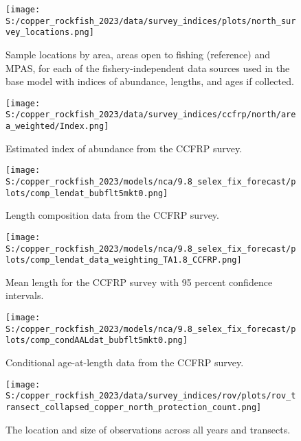 \documentclass[11pt,
  english,
  letterpaper,
]{article}
\begin{document}
\pagebreak

\begin{figure}
\centering
\texttt{[image: S:/copper\_rockfish\_2023/data/survey\_indices/plots/north\_survey\_locations.png]}
\caption{Sample locations by area, areas open to fishing (reference) and MPAS, for each of the fishery-independent data sources used in the base model with indices of abundance, lengths, and ages if collected.\label{fig:ref-mpa}}
\end{figure}

\pagebreak

\begin{figure}
\centering
\texttt{[image: S:/copper\_rockfish\_2023/data/survey\_indices/ccfrp/north/area\_weighted/Index.png]}
\caption{Estimated index of abundance from the CCFRP survey.\label{fig:ccfrp-index-main}}
\end{figure}

\pagebreak

\begin{figure}
\centering
\texttt{[image: S:/copper\_rockfish\_2023/models/nca/9.8\_selex\_fix\_forecast/plots/comp\_lendat\_bubflt5mkt0.png]}
\caption{Length composition data from the CCFRP survey.\label{fig:ccfrp-len-data}}
\end{figure}

\pagebreak

\begin{figure}
\centering
\texttt{[image: S:/copper\_rockfish\_2023/models/nca/9.8\_selex\_fix\_forecast/plots/comp\_lendat\_data\_weighting\_TA1.8\_CCFRP.png]}
\caption{Mean length for the CCFRP survey with 95 percent confidence intervals.\label{fig:ccfrp-mean-len-data}}
\end{figure}

\pagebreak

\begin{figure}
\centering
\texttt{[image: S:/copper\_rockfish\_2023/models/nca/9.8\_selex\_fix\_forecast/plots/comp\_condAALdat\_bubflt5mkt0.png]}
\caption{Conditional age-at-length data from the CCFRP survey.\label{fig:ccfrp-age-data}}
\end{figure}

\pagebreak

\begin{figure}
\centering
\texttt{[image: S:/copper\_rockfish\_2023/data/survey\_indices/rov/plots/rov\_transect\_collapsed\_copper\_north\_protection\_count.png]}
\caption{The location and size of observations across all years and transects.\label{fig:rov-obs-loc}}
\end{figure}
\end{document}
